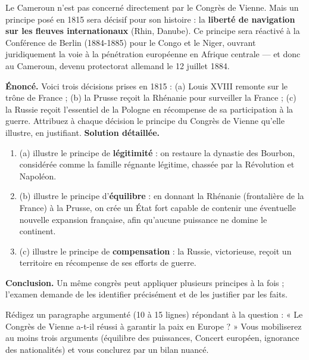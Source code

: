 \documentclass[11pt]{article}
\begin{document}
\begin{savaistu}
Le Cameroun n'est pas concerné directement par le Congrès de Vienne. Mais un principe posé en 1815 sera décisif pour son histoire : la \textbf{liberté de navigation sur les fleuves internationaux} (Rhin, Danube). Ce principe sera réactivé à la Conférence de Berlin (1884-1885) pour le Congo et le Niger, ouvrant juridiquement la voie à la pénétration européenne en Afrique centrale — et donc au Cameroun, devenu protectorat allemand le 12 juillet 1884.
\end{savaistu}

\begin{exoresolu}
\textbf{Énoncé.} Voici trois décisions prises en 1815 : (a) Louis XVIII remonte sur le trône de France ; (b) la Prusse reçoit la Rhénanie pour surveiller la France ; (c) la Russie reçoit l'essentiel de la Pologne en récompense de sa participation à la guerre. Attribuez à chaque décision le principe du Congrès de Vienne qu'elle illustre, en justifiant.
\tcblower
\textbf{Solution détaillée.}
\begin{enumerate}
\item (a) illustre le principe de \textbf{légitimité} : on restaure la dynastie des Bourbon, considérée comme la famille régnante légitime, chassée par la Révolution et Napoléon.
\item (b) illustre le principe d'\textbf{équilibre} : en donnant la Rhénanie (frontalière de la France) à la Prusse, on crée un État fort capable de contenir une éventuelle nouvelle expansion française, afin qu'aucune puissance ne domine le continent.
\item (c) illustre le principe de \textbf{compensation} : la Russie, victorieuse, reçoit un territoire en récompense de ses efforts de guerre.
\end{enumerate}
\textbf{Conclusion.} Un même congrès peut appliquer plusieurs principes à la fois ; l'examen demande de les identifier précisément et de les justifier par les faits.
\end{exoresolu}

\begin{exercice}
Rédigez un paragraphe argumenté (10 à 15 lignes) répondant à la question : « Le Congrès de Vienne a-t-il réussi à garantir la paix en Europe ? » Vous mobiliserez au moins trois arguments (équilibre des puissances, Concert européen, ignorance des nationalités) et vous conclurez par un bilan nuancé.
\end{exercice}
\end{document}
